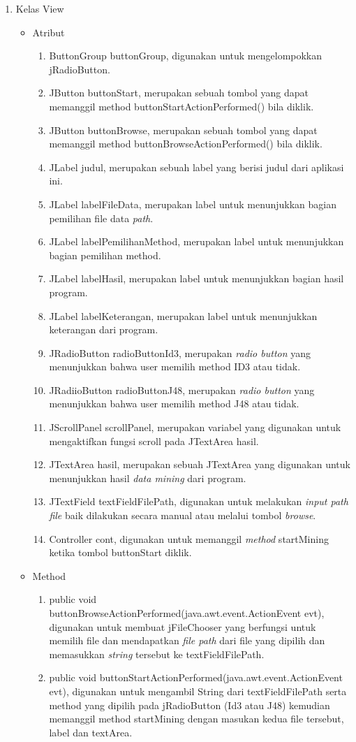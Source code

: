 \begin{enumerate}
	
	\item Kelas View
	\begin{itemize}
		\item Atribut
		\begin{enumerate}
			\item ButtonGroup buttonGroup, digunakan untuk mengelompokkan jRadioButton.
			\item JButton buttonStart, merupakan sebuah tombol yang dapat memanggil method buttonStartActionPerformed() bila diklik.
			\item JButton buttonBrowse, merupakan sebuah tombol yang dapat memanggil method buttonBrowseActionPerformed() bila diklik.
			\item JLabel judul, merupakan sebuah label yang berisi judul dari aplikasi ini.
			\item JLabel labelFileData, merupakan label untuk menunjukkan bagian pemilihan file data \textsl{path}.
			\item JLabel labelPemilihanMethod, merupakan label untuk menunjukkan bagian pemilihan method.
			\item JLabel labelHasil, merupakan label untuk menunjukkan bagian hasil program.
			\item JLabel labelKeterangan, merupakan label untuk menunjukkan keterangan dari program.
			\item JRadioButton radioButtonId3, merupakan \textsl{radio button} yang menunjukkan bahwa user memilih method ID3 atau tidak.
			\item JRadiioButton radioButtonJ48, merupakan \textsl{radio button} yang menunjukkan bahwa user memilih method J48 atau tidak.
			\item JScrollPanel scrollPanel, merupakan variabel yang digunakan untuk mengaktifkan fungsi scroll pada JTextArea hasil.
			\item JTextArea hasil, merupakan sebuah JTextArea yang digunakan untuk menunjukkan hasil \textsl{data mining} dari program.
			\item JTextField textFieldFilePath, digunakan untuk melakukan \textsl{input path file }baik dilakukan secara manual atau melalui tombol \textsl{browse}.
			\item Controller cont, digunakan untuk memanggil \textsl{method} startMining ketika tombol buttonStart diklik.
		\end{enumerate}
		\item Method
		\begin{enumerate}
			\item public void buttonBrowseActionPerformed(java.awt.event.ActionEvent evt), digunakan untuk membuat jFileChooser yang berfungsi untuk memilih file dan mendapatkan \textsl{file path} dari file yang dipilih dan memasukkan \textsl{string }tersebut ke textFieldFilePath.
			\item public void buttonStartActionPerformed(java.awt.event.ActionEvent evt), digunakan untuk mengambil String dari textFieldFilePath serta method yang dipilih pada jRadioButton (Id3 atau J48) kemudian memanggil method startMining dengan masukan kedua file tersebut, label dan textArea.
		\end{enumerate}
	\end{itemize}


\end{enumerate}
